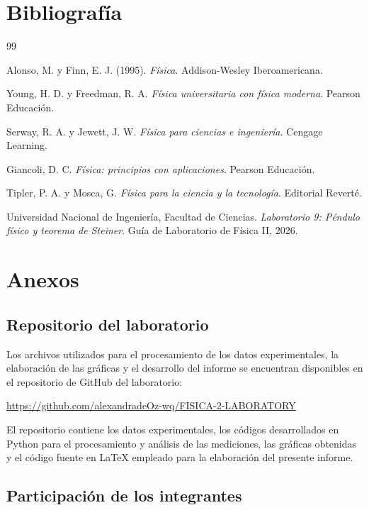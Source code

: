 \documentclass[11pt,a4paper]{article}
\begin{document}
\newpage
\section{Bibliografía}
\begin{thebibliography}{99}

Alonso, M. y Finn, E. J. (1995).
\textit{Física}.
Addison-Wesley Iberoamericana.

Young, H. D. y Freedman, R. A.
\textit{Física universitaria con física moderna}.
Pearson Educación.

Serway, R. A. y Jewett, J. W.
\textit{Física para ciencias e ingeniería}.
Cengage Learning.

Giancoli, D. C.
\textit{Física: principios con aplicaciones}.
Pearson Educación.

Tipler, P. A. y Mosca, G.
\textit{Física para la ciencia y la tecnología}.
Editorial Reverté.

Universidad Nacional de Ingeniería, Facultad de Ciencias.
\textit{Laboratorio 9: Péndulo físico y teorema de Steiner}.
Guía de Laboratorio de Física II, 2026.

\end{thebibliography}

\newpage
\section{Anexos}

\subsection{Repositorio del laboratorio}

Los archivos utilizados para el procesamiento de los datos experimentales,
la elaboración de las gráficas y el desarrollo del informe se encuentran
disponibles en el repositorio de GitHub del laboratorio:

\begin{center}
    \url{https://github.com/alexandradeOz-wq/FISICA-2-LABORATORY}
\end{center}

El repositorio contiene los datos experimentales, los códigos desarrollados
en Python para el procesamiento y análisis de las mediciones, las gráficas
obtenidas y el código fuente en \LaTeX{} empleado para la elaboración del
presente informe.

\subsection{Participación de los integrantes}
\end{document}
